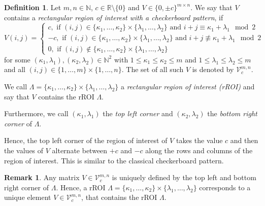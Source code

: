 \documentclass[a4paper,12pt]{article}
\theoremstyle{plain}
\theoremstyle{definition}
\newtheorem{definition}[theorem]{Definition}
\newtheorem{remark}[theorem]{Remark}
\begin{document}
\begin{definition}\label{def: rROIcheckerboard}
	Let $m, n \in \mathbb{N}$, $c \in \mathbb{R} \setminus \{ 0 \}$ and $V \in \{ 0, \pm c \}^{m \times n}$. We say that $V$ contains a \emph{rectangular region of interest with a checkerboard pattern}, if
	\begin{equation}
		V(i, j) =
		\begin{cases}
			c, \textrm{ if } (i, j) \in \{ \kappa_1, \dots, \kappa_2 \} \times \{ \lambda_1, \dots, \lambda_2 \} \textrm{ and } i + j \equiv \kappa_1 + \lambda_1 \mod 2 \\
			-c, \textrm{ if } (i, j) \in \{ \kappa_1, \dots, \kappa_2 \} \times \{ \lambda_1, \dots, \lambda_2 \} \textrm{ and } i + j \not\equiv \kappa_1 + \lambda_1 \mod 2 \\
			0, \textrm{ if } (i, j) \notin \{ \kappa_1, \dots, \kappa_2 \} \times \{ \lambda_1, \dots, \lambda_2 \}
		\end{cases}
	\end{equation}
	for some $(\kappa_1, \lambda_1), (\kappa_2, \lambda_2) \in \mathbb{N}^2$ with $1 \leq \kappa_1 \leq \kappa_2 \leq m$ and $1 \leq \lambda_1 \leq \lambda_2 \leq m$ and all $(i, j) \in \{ 1, \dots, m \} \times \{ 1, \dots, n \}$. The set of all such $V$ is denoted by $\mathcal{V}_c^{m, n}$.
	
	We call $\varLambda = \{ \kappa_1, \dots, \kappa_2 \} \times \{ \lambda_1, \dots, \lambda_2 \}$ a \emph{rectangular region of interest (rROI)} and say that $V$ contains the rROI $\varLambda$.
	
	Furthermore, we call $(\kappa_1, \lambda_1)$ the \emph{top left corner} and $(\kappa_2, \lambda_2)$ the \emph{bottom right corner} of $\varLambda$.
\end{definition}

Hence, the top left corner of the region of interest of $V$ takes the value $c$ and then the values of $V$ alternate between $+c$ and $-c$ along the rows and columns of the region of interest. This is similar to the classical checkerboard pattern.

\begin{remark}
	Any matrix $V \in \mathcal{V}_c^{m, n}$ is uniquely defined by the top left and bottom right corner of $\varLambda$. Hence, a rROI $\varLambda = \{ \kappa_1, \dots, \kappa_2 \} \times \{ \lambda_1, \dots, \lambda_2 \}$ corresponds to a unique element $V \in \mathcal{V}_c^{m, n}$, that contains the rROI $\varLambda$.
\end{remark}
\end{document}
